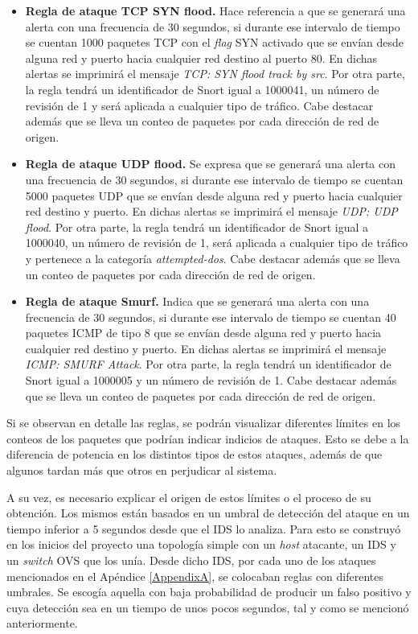 \begin{itemize}
\item {\textbf{Regla de ataque TCP SYN flood.}} Hace referencia a que se
  generará una alerta con una frecuencia de 30 segundos, si durante ese
  intervalo de tiempo se cuentan 1000 paquetes TCP con el \textit{flag} SYN
  activado que se envían desde alguna red y puerto hacia cualquier red destino
  al puerto 80. En dichas alertas se imprimirá el mensaje \textit{TCP: SYN flood
    track by src}. Por otra parte, la regla tendrá un identificador de Snort
  igual a 1000041, un número de revisión de 1 y será aplicada a cualquier tipo
  de tráfico. Cabe destacar además que se lleva un conteo de paquetes por cada
  dirección de red de origen.
\item {\textbf{Regla de ataque UDP flood.}} Se expresa que se generará una
  alerta con una frecuencia de 30 segundos, si durante ese intervalo de tiempo
  se cuentan 5000 paquetes UDP que se envían desde alguna red y puerto hacia
  cualquier red destino y puerto. En dichas alertas se imprimirá el mensaje
  \textit{UDP: UDP flood}. Por otra parte, la regla tendrá un identificador de
  Snort igual a 1000040, un número de revisión de 1, será aplicada a cualquier
  tipo de tráfico y pertenece a la categoría \textit{attempted-dos}. Cabe
  destacar además que se lleva un conteo de paquetes por cada dirección de red
  de origen.
\item {\textbf{Regla de ataque Smurf.}} Indica que se generará una alerta con
  una frecuencia de 30 segundos, si durante ese intervalo de tiempo se cuentan
  40 paquetes ICMP de tipo 8 que se envían desde alguna red y puerto hacia
  cualquier red destino y puerto. En dichas alertas se imprimirá el mensaje
  \textit{ICMP: SMURF Attack}. Por otra parte, la regla tendrá un identificador
  de Snort igual a 1000005 y un número de revisión de 1. Cabe destacar además
  que se lleva un conteo de paquetes por cada dirección de red de origen.

\end{itemize}

Si se observan en detalle las reglas, se podrán visualizar diferentes límites en
los conteos de los paquetes que podrían indicar indicios de ataques. Esto se
debe a la diferencia de potencia en los distintos tipos de estos ataques, además de
que algunos tardan más que otros en perjudicar al sistema.

A su vez, es necesario explicar el origen de estos límites o el proceso de su obtención. Los mismos están basados en un umbral de detección del ataque en un tiempo inferior a 5 segundos desde que el IDS lo analiza. Para esto se construyó en los inicios del proyecto una topología simple con un \textit{host} atacante, un IDS y un \textit{switch} OVS que los unía. Desde dicho IDS, por cada uno de los ataques mencionados en el Apéndice \ref{AppendixA}, se colocaban reglas con diferentes umbrales. Se escogía aquella con baja probabilidad de producir un falso positivo y cuya detección sea en un tiempo de unos pocos segundos, tal y como se mencionó anteriormente.

